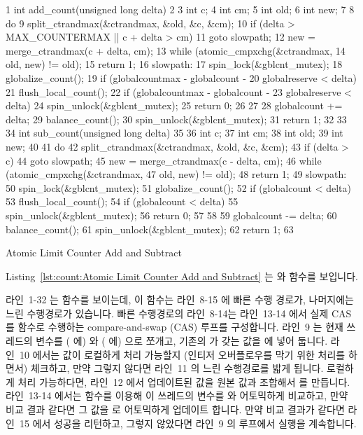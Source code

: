 \begin{listing}[tbp]
{ \scriptsize
\begin{verbbox}
  1 int add_count(unsigned long delta)
  2 {
  3   int c;
  4   int cm;
  5   int old;
  6   int new;
  7 
  8   do {
  9     split_ctrandmax(&ctrandmax, &old, &c, &cm);
 10     if (delta > MAX_COUNTERMAX || c + delta > cm)
 11       goto slowpath;
 12     new = merge_ctrandmax(c + delta, cm);
 13   } while (atomic_cmpxchg(&ctrandmax,
 14                           old, new) != old);
 15   return 1;
 16 slowpath:
 17   spin_lock(&gblcnt_mutex);
 18   globalize_count();
 19   if (globalcountmax - globalcount -
 20       globalreserve < delta) {
 21     flush_local_count();
 22     if (globalcountmax - globalcount -
 23         globalreserve < delta) {
 24       spin_unlock(&gblcnt_mutex);
 25       return 0;
 26     }
 27   }
 28   globalcount += delta;
 29   balance_count();
 30   spin_unlock(&gblcnt_mutex);
 31   return 1;
 32 }
 33 
 34 int sub_count(unsigned long delta)
 35 {
 36   int c;
 37   int cm;
 38   int old;
 39   int new;
 40 
 41   do {
 42     split_ctrandmax(&ctrandmax, &old, &c, &cm);
 43     if (delta > c)
 44       goto slowpath;
 45     new = merge_ctrandmax(c - delta, cm);
 46   } while (atomic_cmpxchg(&ctrandmax,
 47                           old, new) != old);
 48   return 1;
 49 slowpath:
 50   spin_lock(&gblcnt_mutex);
 51   globalize_count();
 52   if (globalcount < delta) {
 53     flush_local_count();
 54     if (globalcount < delta) {
 55       spin_unlock(&gblcnt_mutex);
 56       return 0;
 57     }
 58   }
 59   globalcount -= delta;
 60   balance_count();
 61   spin_unlock(&gblcnt_mutex);
 62   return 1;
 63 }
\end{verbbox}
}
\centering
\theverbbox
\caption{Atomic Limit Counter Add and Subtract}
\label{lst:count:Atomic Limit Counter Add and Subtract}
\end{listing}

Listing~\ref{lst:count:Atomic Limit Counter Add and Subtract} 는
 와  함수를 보입니다.

라인~1-32 는  함수를 보이는데, 이 함수는 라인~8-15 에 빠른 수행
경로가, 나머지에는 느린 수행경로가 있습니다.
빠른 수행경로의 라인~8-14는 라인~13-14 에서 실제 CAS 를 
함수로 수행하는 compare-and-swap (CAS) 루프를 구성합니다.
라인~9 는 현재 쓰레드의  변수를  ( 에) 와
 ( 에) 으로 쪼개고, 기존의  가 갖는
 값을  에 넣어 둡니다.
라인~10 에서는  값이 로컬하게 처리 가능할지 (인티저 오버플로우를 막기
위한 처리를 하면서) 체크하고, 만약 그렇지 않다면 라인~11 의 느린 수행경로를
밟게 됩니다.
로컬하게 처리 가능하다면, 라인~12 에서 업데이트된  값을 원본
 값과 조합해서  를 만듭니다.
라인~13-14 에서는  함수를 이용해 이 쓰레드의
 변수를  와 어토믹하게 비교하고, 만약 비교 결과 같다면 그
값을  로 어토믹하게 업데이트 합니다.
만약 비교 결과가 같다면 라인~15 에서 성공을 리턴하고, 그렇지 않았다면 라인~9 의
루프에서 실행을 계속합니다.
\iffalse

